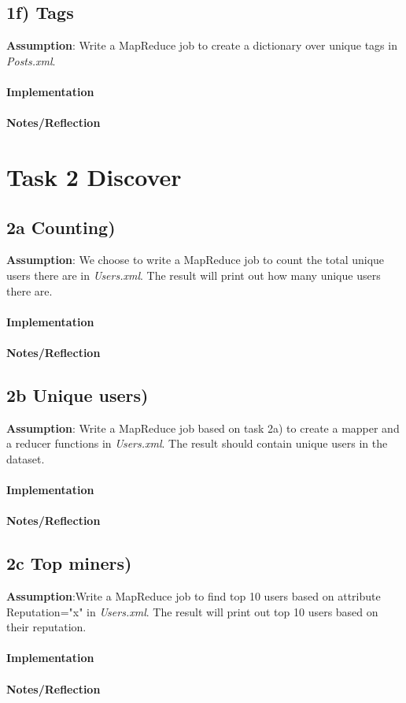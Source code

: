 \documentclass[fleqn,10pt]{wlscirep}
\begin{document}
\subsection*{1f) Tags}
\textbf{Assumption}: Write a MapReduce job to create a dictionary over unique tags in  \textit{Posts.xml}. \\ \\
\textbf{Implementation}  \\ \\
\textbf{Notes/Reflection}

\section*{Task 2 Discover}

\subsection*{2a Counting) }
\textbf{Assumption}: We choose to write a MapReduce job to count the total unique users there are in \textit{Users.xml}. The result will print out how many unique users there are.\\ \\
\textbf{Implementation}  \\ \\
\textbf{Notes/Reflection}

\subsection*{2b Unique users) }
\textbf{Assumption}: Write a MapReduce job based on task 2a) to create a mapper  and a reducer functions in \textit{Users.xml}. The result should contain unique users in the dataset.  \\ \\
\textbf{Implementation}  \\ \\
\textbf{Notes/Reflection}

\subsection*{2c Top miners) }
\textbf{Assumption}:Write a MapReduce job to find top 10 users based on attribute Reputation="x" in \textit{Users.xml}. The result will print out top 10 users based on their reputation. \\ \\
\textbf{Implementation}  \\ \\
\textbf{Notes/Reflection}
\end{document}
